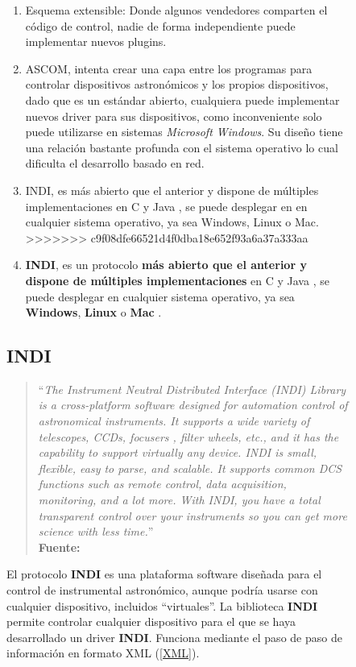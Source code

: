 \begin{itemize}
\begin{itemize}
\begin{figure}[h]
\begin{enumerate}
\item Esquema extensible: Donde algunos vendedores comparten el código de control, nadie de forma independiente puede implementar nuevos plugins.

\item ASCOM, intenta crear una capa entre los programas para controlar dispositivos astronómicos y los propios dispositivos, dado que es un estándar abierto, cualquiera puede implementar nuevos driver para sus dispositivos, como inconveniente solo puede utilizarse en sistemas \textit{Microsoft Windows}. Su diseño tiene una relación bastante profunda con el sistema operativo lo cual dificulta el desarrollo basado en red.

\item INDI, es más abierto que el anterior y dispone de múltiples implementaciones en C y  Java \cite{indiforjava}, se puede desplegar en en cualquier sistema operativo, ya sea Windows, Linux o Mac. 
>>>>>>> c9f08dfe66521d4f0dba18e652f93a6a37a333aa

\item \textbf{INDI}, es un protocolo \textbf{más abierto que el anterior y dispone de múltiples implementaciones} en C y  Java \cite{indiforjava}, se puede desplegar en cualquier sistema operativo, ya sea \textbf{Windows}, \textbf{Linux} o \textbf{Mac} \cite{indi}. 
\end{enumerate}


\subsection{INDI}

\begin{quote}``\textit{The Instrument Neutral Distributed Interface (INDI) Library is a cross-platform software designed for automation  control of astronomical instruments. It supports a wide variety of telescopes, CCDs, focusers , filter wheels, etc., and it has the capability to support virtually any device. INDI is small, flexible, easy to parse, and scalable. It supports common DCS functions such as remote control, data acquisition, monitoring, and a lot more. With INDI, you have a total transparent control over your instruments so you can get more science with less time.}''
\newline
\\
\textbf{Fuente:} \cite{about_indi}
\end{quote}


El protocolo \textbf{INDI} es una plataforma software diseñada para el control de instrumental astronómico, aunque podría usarse con cualquier dispositivo, incluidos ``virtuales''. La biblioteca \textbf{INDI} permite controlar cualquier dispositivo para el que se haya desarrollado un driver \textbf{INDI}. Funciona mediante el paso de paso de información en formato XML (\ref{XML}). 



\end{figure}
\end{itemize}
\end{itemize}

